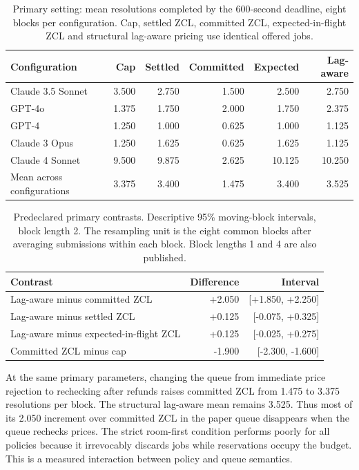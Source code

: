 \documentclass[11pt]{article}
\begin{document}
\begin{table}[tbp]\centering\small
\caption{Primary setting: mean resolutions completed by the 600-second deadline, eight blocks per configuration. Cap, settled ZCL, committed ZCL, expected-in-flight ZCL and structural lag-aware pricing use identical offered jobs.}\label{tab:primary}
\begin{tabular}{lrrrrr}
\toprule
Configuration & Cap & Settled & Committed & Expected & Lag-aware \\ \midrule
Claude 3.5 Sonnet & 3.500 & 2.750 & 1.500 & 2.500 & 2.750 \\
GPT-4o & 1.375 & 1.750 & 2.000 & 1.750 & 2.375 \\
GPT-4 & 1.250 & 1.000 & 0.625 & 1.000 & 1.125 \\
Claude 3 Opus & 1.250 & 1.625 & 0.625 & 1.625 & 1.125 \\
Claude 4 Sonnet & 9.500 & 9.875 & 2.625 & 10.125 & 10.250 \\
Mean across configurations & 3.375 & 3.400 & 1.475 & 3.400 & 3.525 \\
\bottomrule\end{tabular}\end{table}
\begin{table}[tbp]\centering\small
\caption{Predeclared primary contrasts. Descriptive 95\% moving-block intervals, block length 2. The resampling unit is the eight common blocks after averaging submissions within each block. Block lengths 1 and 4 are also published.}\label{tab:ci}
\begin{tabular}{lrr}
\toprule
Contrast & Difference & Interval \\ \midrule
Lag-aware minus committed ZCL & +2.050 & [+1.850, +2.250] \\
Lag-aware minus settled ZCL & +0.125 & [-0.075, +0.325] \\
Lag-aware minus expected-in-flight ZCL & +0.125 & [-0.025, +0.275] \\
Committed ZCL minus cap & -1.900 & [-2.300, -1.600] \\
\bottomrule\end{tabular}\end{table}
At the same primary parameters, changing the queue from immediate price rejection to rechecking after refunds raises committed ZCL from 1.475 to 3.375 resolutions per block. The structural lag-aware mean remains 3.525. Thus most of its 2.050 increment over committed ZCL in the paper queue disappears when the queue rechecks prices. The strict room-first condition performs poorly for all policies because it irrevocably discards jobs while reservations occupy the budget. This is a measured interaction between policy and queue semantics.
\end{document}

